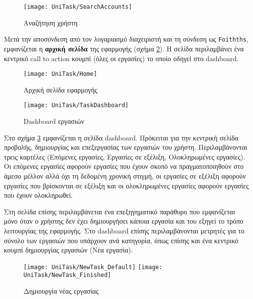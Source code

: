         \begin{figure}[h!] \noindent \centering
            \texttt{[image: UniTask/SearchAccounts]}
            \caption{\centering Αναζήτηση χρήστη}
            \label{fig:unitask_SearchAccounts}
        \end{figure}

        Μετά την αποσύνδεση από τον λογαριασμό διαχειριστή και τη σύνδεση ως \texttt{Foithths}, εμφανίζεται η \textbf{αρχική σελίδα} της εφαρμογής (σχήμα \ref{fig:unitask_Home}). Η σελίδα περιλαμβάνει ένα κεντρικό call to action κουμπί ({\Zona όλες οι εργασίες}) το οποίο οδηγεί στο {\Zona dashboard}.

        \begin{figure}[h!] \noindent \centering
            \texttt{[image: UniTask/Home]}
            \caption{\centering Αρχική σελίδα εφαρμογής}
            \label{fig:unitask_Home}
        \end{figure}

        \begin{figure}[h!] \noindent \centering
            \texttt{[image: UniTask/TaskDashboard]}
            \caption{\centering Dashboard εργασιών}
            \label{fig:unitask_TaskDashboard}
        \end{figure}

        Στο σχήμα \ref{fig:unitask_TaskDashboard} εμφανίζεται η σελίδα {\ZonaSB dashboard}. Πρόκειται για την κεντρική σελίδα προβολής, δημιουργίας και επεξεργασίας των εργασιών του χρήστη. Περιλαμβάνονται τρεις καρτέλες ({\Zona Επόμενες εργασίες}, {\Zona Εργασίες σε εξέλιξη}, {\Zona Ολοκληρωμένες εργασίες}). Οι επόμενες εργασίες αφορούν εργασίες που έχουν σκοπό να πραγματοποιηθούν στο άμεσο μέλλον αλλά όχι τη δεδομένη χρονική στιγμή, οι εργασίες σε εξέλιξη αφορούν εργασίες που βρίσκονται σε εξέλιξη και οι ολοκληρωμένες εργασίες αφορούν εργασίες που έχουν ολοκληρωθεί.

        Στη σελίδα επίσης περιλαμβάνεται ένα επεξηγηματικό παράθυρο που εμφανίζεται μόνο όταν ο χρήστης δεν έχει δημιουργήσει κάποια εργασία και του εξηγεί το τρόπο λειτουργίας της εφαρμογής. Στο {\Zona dashboard} επίσης περιλαμβάνονται μετρητές για το σύνολο των εργασιών που υπάρχουν ανά κατηγορία, όπως επίσης και ένα κεντρικό κουμπί δημιουργίας εργασιών ({\Zona Νέα εργασία}).

        \begin{figure}[h!] \noindent \centering
            \texttt{[image: UniTask/NewTask\_Default]}
            \texttt{[image: UniTask/NewTask\_Finished]}
            \caption{\centering Δημιουργία νέας εργασίας}
            \label{fig:unitask_NewTask}
        \end{figure}

